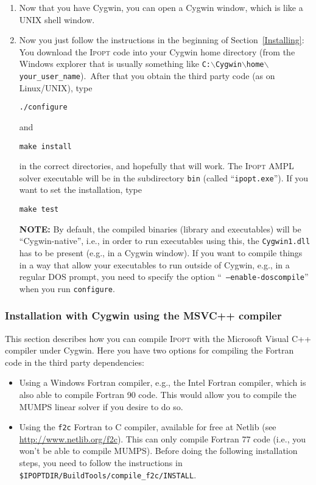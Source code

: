\documentclass[10pt]{article}
\newcommand{\Ipopt}{\textsc{Ipopt}\xspace}
\begin{document}
\begin{enumerate}
\item Now that you have Cygwin, you can open a Cygwin window, which is
  like a UNIX shell window.

\item\label{it:cyg_inst} Now you just follow the instructions in the
  beginning of Section~\ref{Installing}: You download the \Ipopt
  code into your Cygwin home directory (from the Windows explorer that
  is usually something like
  \texttt{C:$\backslash$Cygwin$\backslash$home$\backslash$your\_user\_name}).\
  After that you obtain the third party code (as on Linux/UNIX),
  type

  \texttt{./configure}

  and

  \texttt{make install}

  in the correct directories, and hopefully that will work.  The
  \Ipopt AMPL solver executable will be in the subdirectory
  \texttt{bin} (called ``\texttt{ipopt.exe}'').  If you want to set
  the installation, type

  \texttt{make test}

  \textbf{NOTE:} By default, the compiled binaries (library and
  executables) will be ``Cygwin-native'', i.e., in order to run
  executables using this, the {\tt Cygwin1.dll} has to be present
  (e.g., in a Cygwin window).  If you want to compile things in a way
  that allow your executables to run outside of Cygwin, e.g., in a
  regular DOS prompt, you need to specify the option ``{\tt
    --enable-doscompile}'' when you run {\tt configure}.
\end{enumerate}

\subsubsection{Installation with Cygwin using the MSVC++ compiler}
\label{CygwinInstallNative}

This section describes how you can compile \Ipopt with the Microsoft
Visual C++ compiler under Cygwin.  Here you have two options for
compiling the Fortran code in the third party dependencies:

\begin{itemize}
\item Using a Windows Fortran compiler, e.g., the Intel Fortran
  compiler, which is also able to compile Fortran 90 code.  This would
  allow you to compile the MUMPS linear solver if you desire to do so.
\item Using the {\tt f2c} Fortran to C compiler, available for free at
  Netlib (see \url{http://www.netlib.org/f2c}).  This can only compile
  Fortran 77 code (i.e., you won't be able to compile MUMPS).  Before
  doing the following installation steps, you need to follow the
  instructions in\\ {\tt\$IPOPTDIR/BuildTools/compile\_f2c/INSTALL}.
\end{itemize}
\end{document}
